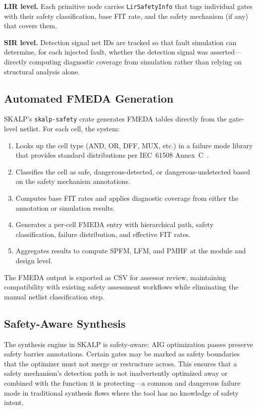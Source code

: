 \documentclass[conference]{IEEEtran}
\begin{document}
\textbf{LIR level.} Each primitive node carries \texttt{LirSafetyInfo} that tags individual gates with their safety classification, base FIT rate, and the safety mechanism (if any) that covers them.

\textbf{SIR level.} Detection signal net IDs are tracked so that fault simulation can determine, for each injected fault, whether the detection signal was asserted---directly computing diagnostic coverage from simulation rather than relying on structural analysis alone.

\subsection{Automated FMEDA Generation}

SKALP's \texttt{skalp-safety} crate generates FMEDA tables directly from the gate-level netlist. For each cell, the system:

\begin{enumerate}
  \item Looks up the cell type (AND, OR, DFF, MUX, etc.) in a failure mode library that provides standard distributions per IEC~61508 Annex~C~\cite{iec61508}.
  \item Classifies the cell as safe, dangerous-detected, or dangerous-undetected based on the safety mechanism annotations.
  \item Computes base FIT rates and applies diagnostic coverage from either the annotation or simulation results.
  \item Generates a per-cell FMEDA entry with hierarchical path, safety classification, failure distribution, and effective FIT rates.
  \item Aggregates results to compute SPFM, LFM, and PMHF at the module and design level.
\end{enumerate}

The FMEDA output is exported as CSV for assessor review, maintaining compatibility with existing safety assessment workflows while eliminating the manual netlist classification step.

\subsection{Safety-Aware Synthesis}

The synthesis engine in SKALP is safety-aware: AIG optimization passes preserve safety barrier annotations. Certain gates may be marked as safety boundaries that the optimizer must not merge or restructure across. This ensures that a safety mechanism's detection path is not inadvertently optimized away or combined with the function it is protecting---a common and dangerous failure mode in traditional synthesis flows where the tool has no knowledge of safety intent.
\end{document}
